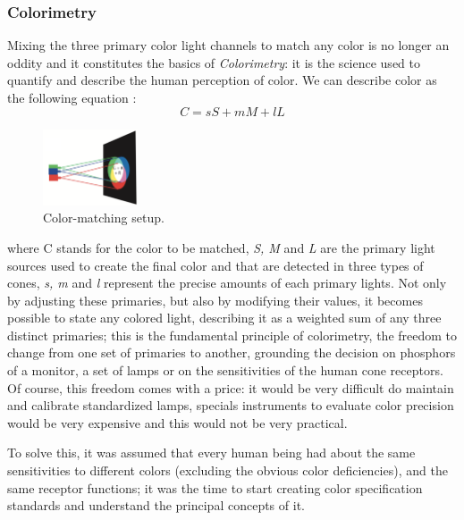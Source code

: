 \subsubsection{Colorimetry}
Mixing the three primary color light channels to match any color is no longer an oddity and it constitutes
the basics of \emph{Colorimetry}: it is the science used to quantify and describe the human perception of color.
We can describe color as the following equation \cite{Ware2012}:
\begin{equation}
C = sS + mM + lL
\end{equation}
%
\begin{figure}
	\centering
    \vspace{-15pt}
    \includegraphics[width=0.25\textwidth]{images/background/Trichromacy.png}
	\caption[Trichromacy Theory]{Color-matching setup. \cite{Ware2012}}
\end{figure}
%
where C stands for the color to be matched, \emph{S, M} and \emph{L} are the primary light sources used to create the final
color and that are detected in three types of cones, \emph{s, m} and \emph{l} represent the precise amounts of each primary
lights. Not only by adjusting these primaries, but also by modifying their values, it becomes possible to
state any colored light, describing it as a weighted
sum of any three distinct primaries; this is the fundamental principle of colorimetry, the freedom to change from
one set of primaries to another, grounding the decision on phosphors of a monitor, a set of lamps or on the
sensitivities of the human cone receptors. Of course, this freedom comes with a price: it would be very difficult
do maintain and calibrate standardized lamps, specials instruments to evaluate color precision would be very
expensive and this would not be very practical. \par
To solve this, it was assumed that every human being had about the
same sensitivities to different colors (excluding the obvious color deficiencies), and the same receptor functions;
it was the time to start creating color specification standards and understand the principal concepts of it.
%
